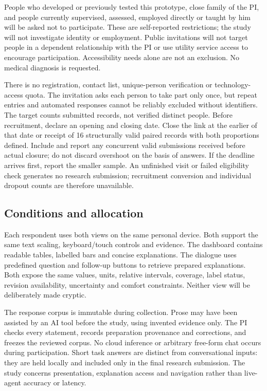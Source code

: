 \documentclass[11pt,letterpaper]{article}
\begin{document}
People who developed or previously tested this prototype, close family of the PI, and people currently supervised, assessed, employed directly or taught by him will be asked not to participate. These are self-reported restrictions; the study will not investigate identity or employment. Public invitations will not target people in a dependent relationship with the PI or use utility service access to encourage participation. Accessibility needs alone are not an exclusion. No medical diagnosis is requested.

There is no registration, contact list, unique-person verification or technology-access quota. The invitation asks each person to take part only once, but repeat entries and automated responses cannot be reliably excluded without identifiers. The target counts submitted records, not verified distinct people. Before recruitment, declare an opening and closing date. Close the link at the earlier of that date or receipt of 16 structurally valid paired records with both proportions defined. Include and report any concurrent valid submissions received before actual closure; do not discard overshoot on the basis of answers. If the deadline arrives first, report the smaller sample. An unfinished visit or failed eligibility check generates no research submission; recruitment conversion and individual dropout counts are therefore unavailable.

\subsection{Conditions and allocation}
Each respondent uses both views on the same personal device. Both support the same text scaling, keyboard/touch controls and evidence. The dashboard contains readable tables, labelled bars and concise explanations. The dialogue uses predefined question and follow-up buttons to retrieve prepared explanations. Both expose the same values, units, relative intervals, coverage, label status, revision availability, uncertainty and comfort constraints. Neither view will be deliberately made cryptic.

The response corpus is immutable during collection. Prose may have been assisted by an AI tool before the study, using invented evidence only. The PI checks every statement, records preparation provenance and corrections, and freezes the reviewed corpus. No cloud inference or arbitrary free-form chat occurs during participation. Short task answers are distinct from conversational inputs: they are held locally and included only in the final research submission. The study concerns presentation, explanation access and navigation rather than live-agent accuracy or latency.
\end{document}

